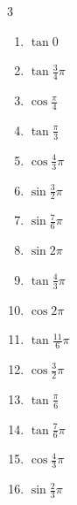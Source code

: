 \begin{multicols}{3}
\begin{enumerate}
  \item $\displaystyle \tan{0}$
        \phantom{$\displaystyle =0$}

  \item $\displaystyle \tan{\frac{3}{4}\pi}$
        \phantom{$\displaystyle =-1$}

  \item $\displaystyle \cos{\frac{\pi}{4}}$

  \item $\displaystyle \tan{\frac{\pi}{3}}$

  \item $\displaystyle \cos{\frac{4}{3}\pi}$

  \item $\displaystyle \sin{\frac{3}{2}\pi}$
        \phantom{$\displaystyle =-1$}

  \item $\displaystyle \sin{\frac{7}{6}\pi}$

  \item $\displaystyle \sin{2\pi}$
        \phantom{$\displaystyle =0$}

  \item $\displaystyle \tan{\frac{4}{3}\pi}$

  \item $\displaystyle \cos{2\pi}$
        \phantom{$\displaystyle =1$}

  \item $\displaystyle \tan{\frac{11}{6}\pi}$

  \item $\displaystyle \cos{\frac{3}{2}\pi}$
        \phantom{$\displaystyle =0$}

  \item $\displaystyle \tan{\frac{\pi}{6}}$

  \item $\displaystyle \tan{\frac{7}{6}\pi}$

  \item $\displaystyle \cos{\frac{4}{3}\pi}$

  \item $\displaystyle \sin{\frac{2}{3}\pi}$


\end{enumerate}
\end{multicols}
